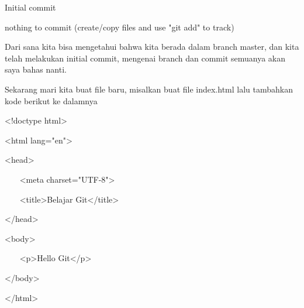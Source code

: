 \noindent 
 \hspace*{0.5in} Initial commit \par
\noindent 
 \hspace*{0.5in} nothing to commit (create/copy files and use "git add" to track) \par
\noindent 
Dari sana kita bisa mengetahui bahwa kita berada dalam branch master, dan kita telah melakukan initial commit, mengenai branch dan commit semuanya akan saya bahas nanti. \par
\vspace{12pt}
\vspace{12pt}
\vspace{12pt}
\noindent 
Sekarang mari kita buat file baru, misalkan buat file index.html lalu tambahkan kode berikut ke dalamnya \par
\noindent 
 \hspace*{0.5in} <!doctype html> \par
\noindent 
 \hspace*{0.5in} <html lang="en"> \par
\noindent 
 \hspace*{0.5in} <head> \par
\noindent 
 \hspace*{0.5in} ~~~ <meta charset="UTF-8"> \par
\noindent 
 \hspace*{0.5in} ~~~ <title>Belajar Git</title> \par
\noindent 
 \hspace*{0.5in} </head> \par
\noindent 
 \hspace*{0.5in} <body> \par
\noindent 
 \hspace*{0.5in} ~~~ <p>Hello Git</p> \par
\noindent 
 \hspace*{0.5in} </body> \par
\noindent 
 \hspace*{0.5in} </html> \par
\noindent 
 \hspace*{0.5in} \vspace{12pt}
\noindent 
 \hspace*{0.5in} \vspace{12pt}
\vspace{12pt}
\vspace{12pt}
\vspace{12pt}
\vspace{12pt}
\noindent 

